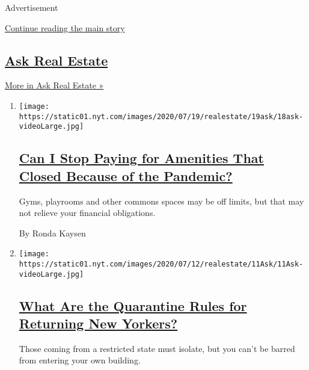 Advertisement

\protect\hyperlink{after-mid1}{Continue reading the main story}

\hypertarget{ask-real-estate-1}{%
\subsection{\texorpdfstring{\href{/column/ask-real-estate}{Ask Real
Estate}}{Ask Real Estate}}\label{ask-real-estate-1}}

\href{/column/ask-real-estate}{More in Ask Real Estate »}

\begin{enumerate}
\def\labelenumi{\arabic{enumi}.}
\item
  \texttt{[image: https://static01.nyt.com/images/2020/07/19/realestate/19ask/18ask-videoLarge.jpg]}

  \hypertarget{can-i-stop-paying-for-amenities-that-closed-because-of-the-pandemic}{%
  \subsection{\texorpdfstring{\href{/2020/07/18/realestate/gym-playroom-fees-coronavirus.html}{Can
  I Stop Paying for Amenities That Closed Because of the
  Pandemic?}}{Can I Stop Paying for Amenities That Closed Because of the Pandemic?}}\label{can-i-stop-paying-for-amenities-that-closed-because-of-the-pandemic}}

  Gyms, playrooms and other commons spaces may be off limits, but that
  may not relieve your financial obligations.

  By Ronda Kaysen
\item
  \texttt{[image: https://static01.nyt.com/images/2020/07/12/realestate/11Ask/11Ask-videoLarge.jpg]}

  \hypertarget{what-are-the-quarantine-rules-for-returning-new-yorkers}{%
  \subsection{\texorpdfstring{\href{/2020/07/11/realestate/what-are-the-quarantine-rules-for-returning-new-yorkers-coronavirus.html}{What
  Are the Quarantine Rules for Returning New
  Yorkers?}}{What Are the Quarantine Rules for Returning New Yorkers?}}\label{what-are-the-quarantine-rules-for-returning-new-yorkers}}

  Those coming from a restricted state must isolate, but you can't be
  barred from entering your own building.


\end{enumerate}
